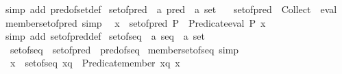 \begin{isabellebody}
\ {\isacharparenleft}{\kern0pt}simp\ add{\isacharcolon}{\kern0pt}\ pred{\isacharunderscore}{\kern0pt}of{\isacharunderscore}{\kern0pt}set{\isacharunderscore}{\kern0pt}def{\isacharparenright}{\kern0pt}%
\endisatagproof
{\isafoldproof}%
%
\isadelimproof
\isanewline
%
\endisadelimproof
\isanewline
{}\isamarkupfalse%
\ set{\isacharunderscore}{\kern0pt}of{\isacharunderscore}{\kern0pt}pred\ {\isacharcolon}{\kern0pt}{\isacharcolon}{\kern0pt}\ {\isachardoublequoteopen}{\isacharprime}{\kern0pt}a\ pred\ {\isasymRightarrow}\ {\isacharprime}{\kern0pt}a\ set{\isachardoublequoteclose}\ \isanewline
\ \ {\isachardoublequoteopen}set{\isacharunderscore}{\kern0pt}of{\isacharunderscore}{\kern0pt}pred\ {\isacharequal}{\kern0pt}\ Collect\ {\isasymcirc}\ eval{\isachardoublequoteclose}\isanewline
\isanewline
{}\isamarkupfalse%
\ member{\isacharunderscore}{\kern0pt}set{\isacharunderscore}{\kern0pt}of{\isacharunderscore}{\kern0pt}pred\ {\isacharbrackleft}{\kern0pt}simp{\isacharbrackright}{\kern0pt}{\isacharcolon}{\kern0pt}\isanewline
\ \ {\isachardoublequoteopen}x\ {\isasymin}\ set{\isacharunderscore}{\kern0pt}of{\isacharunderscore}{\kern0pt}pred\ P\ {\isasymlongleftrightarrow}\ Predicate{\isachardot}{\kern0pt}eval\ P\ x{\isachardoublequoteclose}\isanewline
%
\isadelimproof
\ \ %
\endisadelimproof
%
\isatagproof
{}\isamarkupfalse%
\ {\isacharparenleft}{\kern0pt}simp\ add{\isacharcolon}{\kern0pt}\ set{\isacharunderscore}{\kern0pt}of{\isacharunderscore}{\kern0pt}pred{\isacharunderscore}{\kern0pt}def{\isacharparenright}{\kern0pt}%
\endisatagproof
{\isafoldproof}%
%
\isadelimproof
\isanewline
%
\endisadelimproof
\isanewline
{}\isamarkupfalse%
\ set{\isacharunderscore}{\kern0pt}of{\isacharunderscore}{\kern0pt}seq\ {\isacharcolon}{\kern0pt}{\isacharcolon}{\kern0pt}\ {\isachardoublequoteopen}{\isacharprime}{\kern0pt}a\ seq\ {\isasymRightarrow}\ {\isacharprime}{\kern0pt}a\ set{\isachardoublequoteclose}\ \isanewline
\ \ {\isachardoublequoteopen}set{\isacharunderscore}{\kern0pt}of{\isacharunderscore}{\kern0pt}seq\ {\isacharequal}{\kern0pt}\ set{\isacharunderscore}{\kern0pt}of{\isacharunderscore}{\kern0pt}pred\ {\isasymcirc}\ pred{\isacharunderscore}{\kern0pt}of{\isacharunderscore}{\kern0pt}seq{\isachardoublequoteclose}\isanewline
\isanewline
{}\isamarkupfalse%
\ member{\isacharunderscore}{\kern0pt}set{\isacharunderscore}{\kern0pt}of{\isacharunderscore}{\kern0pt}seq\ {\isacharbrackleft}{\kern0pt}simp{\isacharbrackright}{\kern0pt}{\isacharcolon}{\kern0pt}\isanewline
\ \ {\isachardoublequoteopen}x\ {\isasymin}\ set{\isacharunderscore}{\kern0pt}of{\isacharunderscore}{\kern0pt}seq\ xq\ {\isacharequal}{\kern0pt}\ Predicate{\isachardot}{\kern0pt}member\ xq\ x{\isachardoublequoteclose}\isanewline

\end{isabellebody}
